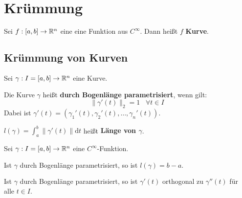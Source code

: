 \chapter{Krümmung}

\begin{definition}%
  Sei $f: [a, b] \rightarrow \mathbb{R}^n$ eine eine Funktion aus $C^\infty$.
  Dann heißt $f$ \textbf{Kurve}.
\end{definition}

\section{Krümmung von Kurven}\label{sec:Kurvenkrümmung}
\begin{definition}%
    Sei $\gamma: I = [a, b] \rightarrow \mathbb{R}^n$ eine Kurve.

    \begin{defenum}
        \item Die Kurve $\gamma$ heißt
              \textbf{durch Bogenlänge parametrisiert},
              wenn gilt:
              \[\|\gamma'(t)\|_2 = 1 \;\;\; \forall t \in I\]
              Dabei ist $\gamma'(t) = \left (\gamma_1'(t), \gamma_2'(t), \dots, \gamma_n'(t) \right)$.
        \item $l(\gamma) = \int_a^b \|\gamma'(t)\| \mathrm{d} t$ heißt
              \textbf{Länge von $\gamma$}.
    \end{defenum}
\end{definition}

\begin{bemerkung}%
    Sei $\gamma: I = [a, b] \rightarrow \mathbb{R}^n$ eine $C^\infty$-Funktion.

    \begin{bemenum}
        \item Ist $\gamma$ durch Bogenlänge parametrisiert, so ist $l(\gamma) = b-a$.
        \item \label{bem:16.1d} Ist $\gamma$ durch Bogenlänge parametrisiert, so ist
              $\gamma'(t)$ orthogonal zu $\gamma''(t)$ für alle $t \in I$.
    \end{bemenum}
\end{bemerkung}

